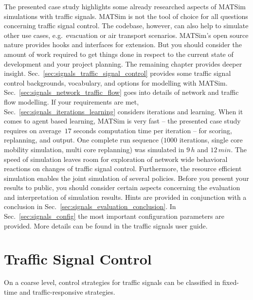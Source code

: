 The presented case study highlights some already researched aspects of MATSim simulations with traffic signals. 
MATSim is not the tool of choice for all questions concerning traffic signal control. 
The codebase, however, can also help to simulate other use cases, e.g.~evacuation or air transport scenarios. 
MATSim's open source nature provides hooks and interfaces for extension. 
But you should consider the amount of work required to get things done in respect to the current state of development and your project planning. 
The remaining chapter provides deeper insight.  
Sec.~\ref{sec:signals_traffic_signal_control} provides some traffic signal control backgrounds, vocabulary, and options for modelling with MATSim.  
Sec.~\ref{sec:signals_network_traffic_flow} goes into details of network and traffic flow modelling. 
If your requirements are met, Sec.~\ref{sec:signals_iterations_learning} considers iterations and learning. 
When it comes to agent based learning, MATSim is very fast -- the presented case study requires on average~$17$ seconds computation time per iteration -- for scoring, replanning, and output. One complete run sequence ($1000$ iterations, single core mobility simulation, multi core replanning) was simulated in $9 \, h$ and $12 \, min$. 
The speed of simulation leaves room for exploration of network wide behavioral reactions on changes of traffic signal control. 
Furthermore, the resource efficient simulation enables the joint simulation of several policies. 
Before you present your results to public, you should consider certain aspects concerning the  evaluation and interpretation of simulation results. 
Hints are provided in conjunction with a conclusion in Sec.~\ref{sec:signals_evaluation_conclusion}. 
In Sec.~\ref{sec:signals_config} the most important configuration parameters are provided. 
More details can be found in the traffic signals user guide. 

\section{Traffic Signal Control}

On a coarse level, control strategies for traffic signals can be classified in fixed-time and traffic-responsive strategies. 

